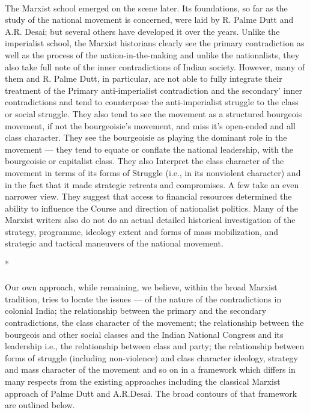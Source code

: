 \paragraph*{}
The Marxist school emerged on the scene later. Its foundations, so far as the study of the national movement is concerned, were laid by R. Palme Dutt and A.R. Desai; but several others have developed it over the years. Unlike the imperialist school, the Marxist historians clearly see the primary contradiction as well as the process of the nation-in-the-making and unlike the nationalists, they also take full note of the inner contradictions of Indian society. However, many of them and R. Palme Dutt, in particular, are not able to fully integrate their treatment of the Primary anti-imperialist contradiction and the secondary' inner contradictions and tend to counterpose the anti-imperialist struggle to the class or social struggle. They also tend to see the movement as a structured bourgeois movement, if not the bourgeoisie's movement, and miss it's open-ended and all class character. They see the bourgeoisie as playing the dominant role in the movement — they tend to equate or conflate the national leadership, with the bourgeoisie or capitalist class. They also Interpret the class character of the movement in terms of its forms of Struggle (i.e., in its nonviolent character) and in the fact that it made strategic retreats and compromises. A few take an even narrower view. They suggest that access to financial resources determined the ability to influence the Course and direction of nationalist politics. Many of the Marxist writers also do not do an actual detailed historical investigation of the strategy, programme, ideology extent and forms of mass mobilization, and strategic and tactical maneuvers of the national movement.

\begin{center}*\end{center}

\paragraph*{}
Our own approach, while remaining, we believe, within the broad Marxist tradition, tries to locate the issues — of the nature of the contradictions in colonial India; the relationship between the primary and the secondary contradictions, the class character of the movement; the relationship between the bourgeois and other social classes and the Indian National Congress and its leadership i.e., the relationship between class and party; the relationship between forms of struggle (including non-violence) and class character ideology, strategy and mass character of the movement and so on in a framework which differs in many respects from the existing approaches including the classical Marxist approach of Palme Dutt and A.R.Desai. The broad contours of that framework are outlined below.

